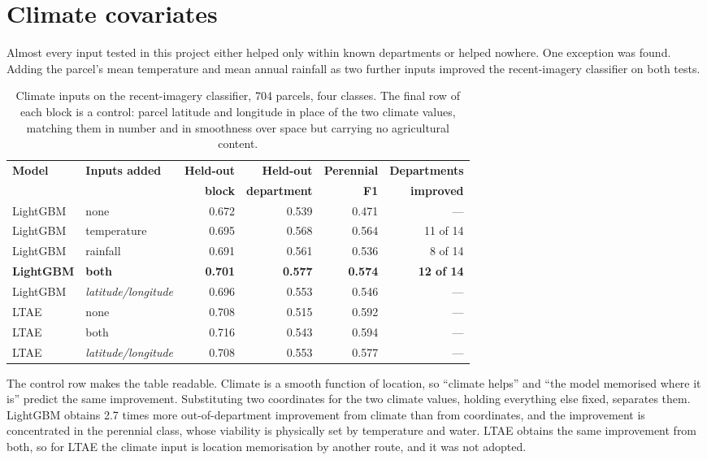 \documentclass[11pt,a4paper]{article}
\begin{document}
\section{Climate covariates}

Almost every input tested in this project either helped only within known departments or helped
nowhere. One exception was found. Adding the parcel's mean temperature and mean annual rainfall
as two further inputs improved the recent-imagery classifier on both tests.

\begin{table}[htbp]
\centering
\small
\caption{Climate inputs on the recent-imagery classifier, 704 parcels, four classes. The final
row of each block is a control: parcel latitude and longitude in place of the two climate values,
matching them in number and in smoothness over space but carrying no agricultural content.}
\label{tab:climate}
\begin{tabular}{@{}llrrrr@{}}
\toprule
\textbf{Model} & \textbf{Inputs added} & \textbf{Held-out} & \textbf{Held-out} & \textbf{Perennial} & \textbf{Departments} \\
 & & \textbf{block} & \textbf{department} & \textbf{F1} & \textbf{improved} \\
\midrule
LightGBM & none & 0.672 & 0.539 & 0.471 & --- \\
LightGBM & temperature & 0.695 & 0.568 & 0.564 & 11 of 14 \\
LightGBM & rainfall & 0.691 & 0.561 & 0.536 & 8 of 14 \\
\textbf{LightGBM} & \textbf{both} & \textbf{0.701} & \textbf{0.577} & \textbf{0.574} & \textbf{12 of 14} \\
LightGBM & \emph{latitude/longitude} & 0.696 & 0.553 & 0.546 & --- \\
\midrule
LTAE & none & 0.708 & 0.515 & 0.592 & --- \\
LTAE & both & 0.716 & 0.543 & 0.594 & --- \\
LTAE & \emph{latitude/longitude} & 0.708 & 0.553 & 0.577 & --- \\
\bottomrule
\end{tabular}
\end{table}

The control row makes the table readable. Climate is a smooth function of location, so ``climate
helps'' and ``the model memorised where it is'' predict the same improvement. Substituting two
coordinates for the two climate values, holding everything else fixed, separates them. LightGBM
obtains 2.7 times more out-of-department improvement from climate than from coordinates, and the
improvement is concentrated in the perennial class, whose viability is physically set by
temperature and water. LTAE obtains the same improvement from both, so for LTAE the climate input
is location memorisation by another route, and it was not adopted.
\end{document}
